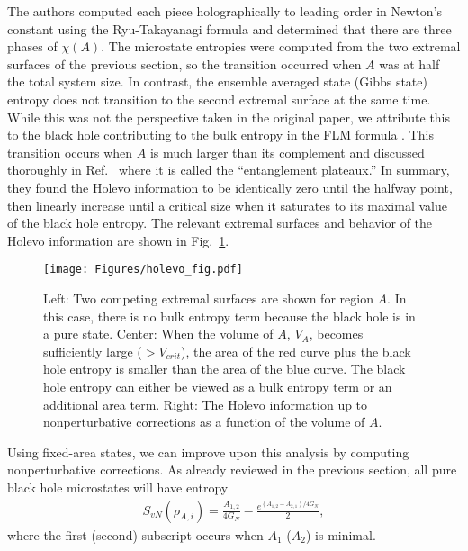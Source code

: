 \documentclass[a4paper,11pt]{article}
\begin{document}
The authors computed each piece holographically to leading order in Newton's constant using the Ryu-Takayanagi formula \cite{2006PhRvL..96r1602R,2006JHEP...08..045R} and determined that there are three phases of $\chi(A)$. The microstate entropies were computed from the two extremal surfaces of the previous section, so the transition occurred when $A$ was at half the total system size. In contrast, the ensemble averaged state (Gibbs state) entropy does not transition to the second extremal surface at the same time. While this was not the perspective taken in the original paper, we attribute this to the black hole contributing to the bulk entropy in the FLM formula \cite{2013JHEP...11..074F}. This transition occurs when $A$ is much larger than its complement and discussed thoroughly in Ref.~\cite{2013JHEP...08..092H} where it is called the ``entanglement plateaux.'' In summary, they found the Holevo information to be identically zero until the halfway point, then linearly increase until a critical size when it saturates to its maximal value of the black hole entropy. The relevant extremal surfaces and behavior of the Holevo information are shown in Fig.~\ref{holevo_fig}.


\begin{figure}
    \centering
    \texttt{[image: Figures/holevo\_fig.pdf]}
    \caption{Left: Two competing extremal surfaces are shown for region $A$. In this case, there is no bulk entropy term because the black hole is in a pure state. Center: When the volume of $A$, $V_A$, becomes sufficiently large ($>V_{crit}$), the area of the red curve plus the black hole entropy is smaller than the area of the blue curve. The black hole entropy can either be viewed as a bulk entropy term or an additional area term. Right: The Holevo information up to nonperturbative corrections as a function of the volume of $A$.}
    \label{holevo_fig}
\end{figure}

Using fixed-area states, we can improve upon this analysis by computing nonperturbative corrections. As already reviewed in the previous section, all pure black hole microstates will have entropy
\begin{align}
    S_{vN}(\rho_{A,i}) = \frac{A_{1,2}}{4G_N}  -\frac{e^{(A_{1,2} - A_{2,1})/4G_N}}{2},
\end{align}
where the first (second) subscript occurs when $A_1$ ($A_2$) is minimal. 
\end{document}

